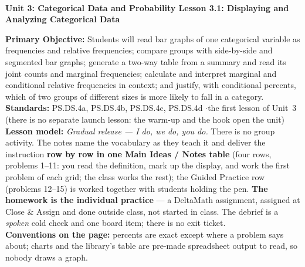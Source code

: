 \documentclass[10pt]{article}
\newcommand{\UnitNumberName}{Unit 3: Categorical Data and Probability \quad}
\newcommand{\LessonNumberName}{Lesson 3.1: Displaying and Analyzing Categorical Data}
\begin{document}
\begin{center}
    {\Large\bfseries \CourseName \\
    {\small\bfseries \UnitNumberName \LessonNumberName}}
\end{center}

\begin{tcolorbox}[colback=frost, colframe=cerulean, boxrule=0.9pt, arc=2mm,
    left=2mm, right=2mm, top=1.5mm, bottom=1.5mm]
    \textbf{Primary Objective:} Students will read bar graphs of one categorical variable as
    frequencies and relative frequencies; compare groups with side-by-side and segmented bar
    graphs; generate a two-way table from a summary and read its joint counts and marginal
    frequencies; calculate and interpret marginal and conditional relative frequencies in
    context; and justify, with conditional percents, which of two groups of different sizes is
    more likely to fall in a category.
    \\[2pt]
    \textbf{Standards:} PS.DS.4a, PS.DS.4b, PS.DS.4c, PS.DS.4d \quad$\cdot$\quad the first lesson
    of Unit~3 (there is no separate launch lesson: the warm-up and the hook open the unit)
    \\[2pt]
    \textbf{Lesson model:} \emph{Gradual release --- I do, we do, you do.} There is no group
    activity. The notes name the vocabulary as they teach it and deliver the instruction
    \textbf{row by row in one Main Ideas / Notes table} (four rows, problems 1--11: you read the
    definition, mark up the display, and work the first problem of each grid; the class works the
    rest); the Guided Practice row (problems 12--15) is worked together with students holding the
    pen. \textbf{The homework is the individual practice} --- a DeltaMath assignment, assigned at
    Close \& Assign and done outside class, not started in class. The debrief is a \emph{spoken} cold check and one
    board item; there is no exit ticket.
    \\[2pt]
    \textbf{Conventions on the page:} percents are exact except where a problem says about;
    charts and the library's table are pre-made spreadsheet output to read, so nobody draws a
    graph.
\end{tcolorbox}
\end{document}
